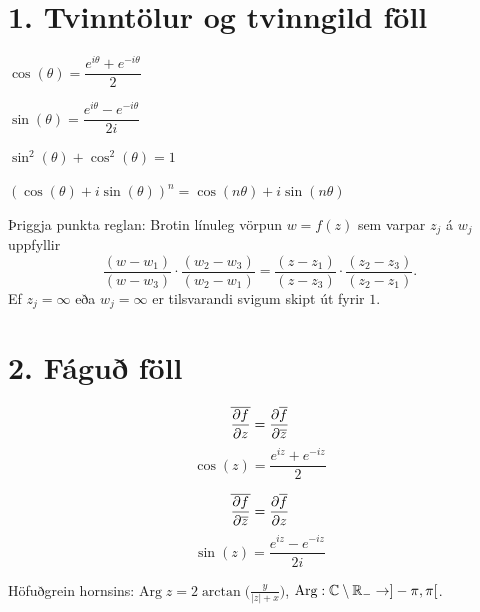 \noindent
\section*{1. Tvinntölur og tvinngild föll}

\begin{minipage}{.5\linewidth}
  $\cos(\theta) = \dfrac{e^{i \theta}+e^{-i\theta}}{2}$
\end{minipage}%
\begin{minipage}{.5\linewidth}
	$\sin(\theta) = \dfrac{e^{i \theta}-e^{-i\theta}}{2i}$
\end{minipage}

\begin{minipage}{.5\linewidth}
  $\sin^2(\theta) + \cos^2(\theta) =1$
\end{minipage}%
\begin{minipage}{.5\linewidth}
	$(\cos(\theta)+i\sin(\theta))^n = \cos(n\theta)+i\sin(n\theta)$
\end{minipage}

\medskip

Þriggja punkta reglan: Brotin línuleg vörpun $w = f(z)$ sem varpar $z_j$ á $w_j$ uppfyllir
$$\frac{(w - w_1)}{(w - w_3)} \cdot \frac{(w_2 - w_3)}{(w_2 - w_1)} = \frac{(z - z_1)}{(z - z_3)} \cdot \frac{(z_2 - z_3)}{(z_2 - z_1)}.$$
Ef $z_j = \infty$ eða $w_j = \infty$ er tilsvarandi svigum skipt út fyrir $1$.

\section*{2. Fáguð föll}

\begin{minipage}{.5\linewidth}
	$$\overline {{\frac{\partial f}{\partial z}}} = {\frac{\partial  \overline{f}}{\partial \overline z}}$$
  \begin{equation*}
		\cos(z) = \frac{e^{iz}+e^{-iz}}2
\end{equation*}

\end{minipage}%
\begin{minipage}{.5\linewidth}
	$$\overline {{\frac{\partial f}{\partial \overline z}}} = {\frac{\partial \overline{f}}{\partial z}}$$
\begin{equation*}
		\sin(z) = \frac{e^{iz}-e^{-iz}}{2i}
\end{equation*}

\end{minipage}

Höfuðgrein hornsins:
$\displaystyle  \text{Arg} \; z = 2 \arctan \bigg(\frac{y}{|z| + x} \biggl)$, 
$\text{Arg}: {\mathbb C} \setminus {\mathbb R}_- \to ]-\pi,\pi[$.

